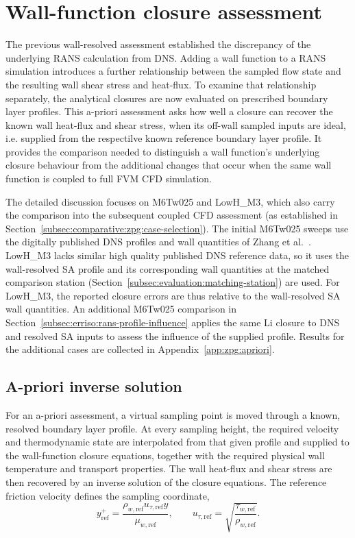 \section{Wall-function closure assessment}
\label{sec:comparative:zpg:cross-comparison}

The previous wall-resolved assessment established the discrepancy of the underlying RANS calculation from DNS. Adding a wall function to a RANS simulation introduces a further relationship between the sampled flow state and the resulting wall shear stress and heat-flux. To examine that relationship separately, the analytical closures are now evaluated on prescribed boundary layer profiles. This a-priori assessment asks how well a closure can recover the known wall heat-flux and shear stress, when its off-wall sampled inputs are ideal, i.e. supplied from the respectilve known reference boundary layer profile. It provides the comparison needed to distinguish a wall function's underlying closure behaviour from the additional changes that occur when the same wall function is coupled to full FVM CFD simulation.
\par\medskip

The detailed discussion focuses on M6Tw025 and LowH\_M3, which also carry the comparison into the subsequent coupled CFD assessment (as established in Section~\ref{subsec:comparative:zpg:case-selection}). The initial M6Tw025 sweeps use the digitally published DNS profiles and wall quantities of Zhang et al.~\cite{zhang2018direct}. LowH\_M3 lacks similar high quality published DNS reference data, so it uses the wall-resolved SA profile and its corresponding wall quantities at the matched comparison station (Section~\ref{subsec:evaluation:matching-station}) are used. For LowH\_M3, the reported closure errors are thus relative to the wall-resolved SA wall quantities. An additional M6Tw025 comparison in Section~\ref{subsec:erriso:rans-profile-influence} applies the same Li closure to DNS and resolved SA inputs to assess the influence of the supplied profile. Results for the additional cases are collected in Appendix~\ref{app:zpg:apriori}.

\subsection{A-priori inverse solution}
\label{subsec:erriso:apriori-solver}

For an a-priori assessment, a virtual sampling point is moved through a known, resolved boundary layer profile. At every sampling height, the required velocity and thermodynamic state are interpolated from that given profile and supplied to the wall-function closure equations, together with the required physical wall temperature and transport properties. The wall heat-flux and shear stress are then recovered by an inverse solution of the closure equations. The reference friction velocity defines the sampling coordinate,
\begin{equation}
    y_{\mathrm{ref}}^+
    = \frac{\rho_{w,\mathrm{ref}}u_{\tau,\mathrm{ref}}y}
    {\mu_{w,\mathrm{ref}}},
    \qquad
    u_{\tau,\mathrm{ref}}
    = \sqrt{\frac{\tau_{w,\mathrm{ref}}}{\rho_{w,\mathrm{ref}}}}.
\end{equation}

